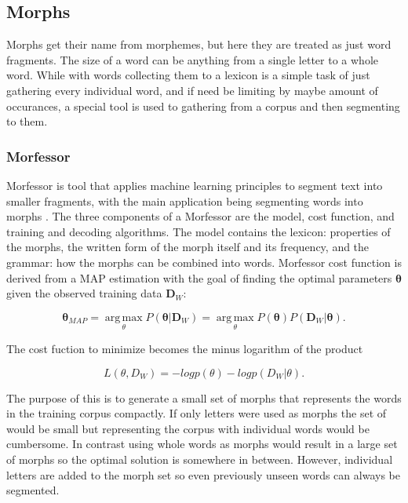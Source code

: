 \documentclass[b5paper]{article}
\begin{document}
\subsection{Morphs}

Morphs get their name from morphemes, but here they are treated as just word fragments. The size of a word can be anything from a single letter to a whole word. While with words collecting them to a lexicon is a simple task of just gathering every individual word, and if need be limiting by maybe amount of occurances, a special tool is used to gathering from a corpus and then segmenting to them.

\subsubsection{Morfessor}

Morfessor is tool that applies machine learning principles to segment text into smaller fragments, with the main application being segmenting words into morphs \cite{creutz2007unsupervised}. The three components of a Morfessor are the model, cost function, and training and decoding algorithms. The model contains the lexicon: properties of the morphs, the written form of the morph itself and its frequency, and the grammar: how the morphs can be combined into words. Morfessor cost function is derived from a MAP estimation with the goal of finding the optimal parameters $\bm{\theta}$ given the observed training data $\bm{D}_W$:

\begin{equation}
\bm{\theta}_{MAP}=\operatorname*{arg\,max}_{\theta}P(\bm{\theta}|\bm{D}_W)=\operatorname*{arg\,max}_{\theta}P(\bm{\theta})P(\bm{D}_W|\bm{\theta}).
\end{equation}

The cost fuction to minimize becomes the minus logarithm of the product

\begin{equation}
L(\theta, D_W)=-log p(\theta)-log p(D_W|\theta).
\end{equation}

The purpose of this is to generate a small set of morphs that represents the words in the training corpus compactly. If only letters were used as morphs the set of would be small but representing the corpus with individual words would be cumbersome. In contrast using whole words as morphs would result in a large set of morphs so the optimal solution is somewhere in between. However, individual letters are added to the morph set so even previously unseen words can always be segmented.
\end{document}
